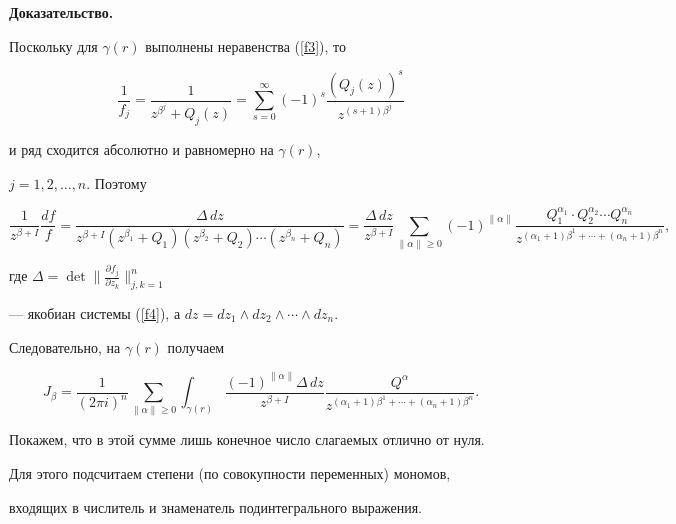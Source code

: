 {\bf Доказательство.}


Поскольку для $\gamma(r)$ выполнены неравенства (\ref{f3}), то


$$


\frac 1{f_j}=\frac 1{z^{\beta^j}+Q_j(z)}=


\sum_{s=0}^\infty (-1)^s\frac{(Q_j(z))^s}{z^{(s+1)\beta^j}}


$$


и ряд сходится абсолютно и равномерно на $\gamma(r)$,


$j=1,2,\dotsc, n$. Поэтому


$$


\frac 1{z^{\beta+I}}\frac{df}{f}=\frac{\Delta\, dz}{z^{\beta+I}(z^{\beta_1}


+Q_1)(z^{\beta_2}+Q_2)\dotsb (z^{\beta_n}+Q_n)}=


\frac{\Delta\, dz}{z^{\beta+I}}\sum_{\|\alpha\|\geqslant 0}(-1)^{\|\alpha\|}


\frac{Q_1^{\alpha_1}\cdot Q_2^{\alpha_2}\dotsb


Q_n^{\alpha_n}}{z^{(\alpha_1+1)\beta^1


+\dotsb+(\alpha_n+1)\beta^n}},


$$


где $\Delta=\det \big\|\frac{\partial f_j}{\partial z_k}\big\|_{j,k=1}^n$


--- якобиан системы (\ref{f4}), а $dz=dz_1\land dz_2\land\dotsb\land dz_n$.





Следовательно, на $\gamma(r)$ получаем


\begin{equation}\label{f5}


J_\beta=\frac 1{(2\pi i)^n}\sum_{\|\alpha\|\geqslant 0}\int_{\gamma(r)}


\frac{(-1)^{\|\alpha\|}\Delta\, dz}{z^{\beta+I}}\frac{Q^\alpha}{z^{


(\alpha_1+1)\beta^1+\dotsb+ (\alpha_n+1)\beta^n}}.


\end{equation}





Покажем, что в этой сумме лишь конечное число слагаемых отлично от нуля.


Для этого подсчитаем степени (по совокупности переменных) мономов, 


входящих в числитель и знаменатель подинтегрального выражения.





